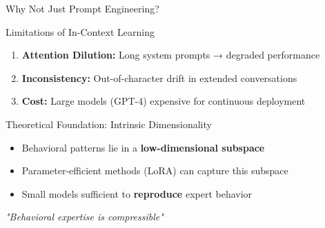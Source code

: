 \documentclass[aspectratio=169]{beamer}
\begin{document}
\begin{frame}{Why Not Just Prompt Engineering?}
\begin{alertblock}{Limitations of In-Context Learning}
\begin{enumerate}
    \item \textbf{Attention Dilution:} Long system prompts → degraded performance
    \item \textbf{Inconsistency:} Out-of-character drift in extended conversations
    \item \textbf{Cost:} Large models (GPT-4) expensive for continuous deployment
\end{enumerate}
\end{alertblock}

\vspace{0.3cm}
\begin{block}{Theoretical Foundation: Intrinsic Dimensionality}
\begin{itemize}
    \item Behavioral patterns lie in a \textbf{low-dimensional subspace}
    \item Parameter-efficient methods (LoRA) can capture this subspace
    \item Small models sufficient to \textbf{reproduce} expert behavior
\end{itemize}
\end{block}

\vspace{0.3cm}
\begin{center}
\textit{"Behavioral expertise is compressible"}
\end{center}
\end{frame}
\end{document}
